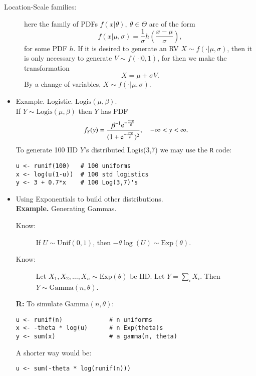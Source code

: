 \documentclass[captions=tableheading]{scrbook}
\begin{document}
\begin{description}
\item[Location-Scale families:] here the family of PDFs $f(x|\theta),\ \theta\in\Theta$ are of the form 
  \[
  f(x|\mu,\sigma)=\frac{1}{\sigma}h\left(\frac{x-\mu}{\sigma}\right),
  \]
  for some PDF $h$. If it is desired to generate an RV $X\sim f(\cdot|\mu,\sigma)$, then it is only necessary to generate $V\sim f(\cdot|0,1)$, for then we make the transformation 
  \[
  X = \mu + \sigma V.
  \]
  By a change of variables, \( X \sim f(\cdot|\mu,\sigma) \).
\end{description}
\begin{itemize}

\item Example. Logistic. \( \mathrm{Logis}(\mu,\beta) \).\\
\label{sec-2_3_2_1}%
If \( Y \sim \mathrm{Logis}(\mu,\beta) \) then $Y$ has PDF
\[
f_{Y}(y)=\frac{\beta^{-1}\mathrm{e}^{-\frac{y-\mu}{\beta}}}{(1 + \mathrm{e}^{-\frac{y-\mu}{\beta}})^{2}},\quad -\infty< y <\infty.
\]
To generate 100 IID $Y$'s distributed Logis(3,7) we may use the \texttt{R} code:

\begin{verbatim}
u <- runif(100)   # 100 uniforms
x <- log(u(1-u))  # 100 std logistics
y <- 3 + 0.7*x    # 100 Log(3,7)'s
\end{verbatim}


\item Using Exponentials to build other distributions.\\
\label{sec-2_3_2_2}%
\textbf{Example.} Generating Gammas.


\begin{description}
\item[Know:] If \(U \sim\mathrm{Unif}(0,1)\), then \( -\theta\log(U)\sim\mathrm{Exp}(\theta) \).
\item[Know:] Let $X_{1},X_{2},\ldots,X_{n}\sim\mathrm{Exp}(\theta)$ be IID.  Let $Y=\sum_{i}X_{i}$. Then $Y\sim\mathrm{Gamma}(n,\theta)$.
\end{description}
\textbf{R:} To simulate \( \mathrm{Gamma}(n,\theta) \):
\begin{verbatim}
u <- runif(n)             # n uniforms
x <- -theta * log(u)      # n Exp(theta)s
y <- sum(x)               # a gamma(n, theta)
\end{verbatim}

A shorter way would be:
\begin{verbatim}
u <- sum(-theta * log(runif(n)))
\end{verbatim}


\end{itemize}
\end{document}
